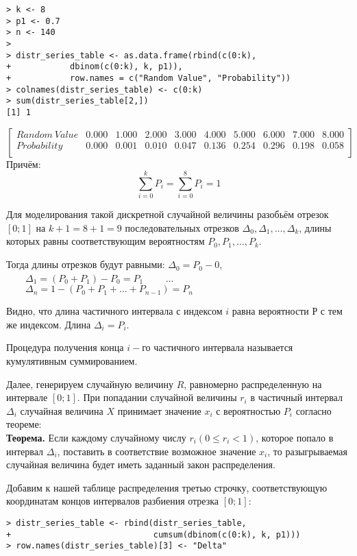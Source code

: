 \documentclass[14pt,a4paper]{scrartcl}
\begin{document}
\begin{verbatim}
> k <- 8
> p1 <- 0.7
> n <- 140
> 
> distr_series_table <- as.data.frame(rbind(c(0:k),
+            dbinom(c(0:k), k, p1)), 
+            row.names = c("Random Value", "Probability"))
> colnames(distr_series_table) <- c(0:k)
> sum(distr_series_table[2,])
[1] 1
\end{verbatim}

\begin{equation*}
	\begin{bmatrix}{}
	Random \: Value & 0.000 & 1.000 & 2.000 & 3.000 & 4.000 & 5.000 & 6.000 & 7.000 & 8.000 \\ 
	Probability & 0.000 & 0.001 & 0.010 & 0.047 & 0.136 & 0.254 & 0.296 & 0.198 & 0.058 \\ 
	\end{bmatrix}
\end{equation*}
Причём:
\begin{equation*}
	\sum_{i = 0}^{k}P_i = \sum_{i = 0}^{8}P_i = 1
\end{equation*}

Для моделирования такой дискретной случайной величины разобьём отрезок $[0;1]$ на $k+1 = 8 + 1 = 9$ последовательных отрезков $\Delta_0, \Delta_1, \dots, \Delta_{k}$, длины которых равны соответствующим вероятностям $P_0, P_1, \dots, P_{k}$.

Тогда длины отрезков будут равными: $\Delta_0 = P_0 - 0$, $\qquad \Delta_1 = (P_0 + P_1) - P_0 = P_1$ $\qquad \dots$$\qquad \Delta_n = 1 - (P_0 + P_1 + \dots + P_{n-1}) = P_n$

Видно, что длина частичного интервала с индексом $i$ равна вероятности $Р$ с тем же индексом. Длина $\Delta_i = P_i$.

Процедура получения конца $i-$го частичного интервала называется кумулятивным суммированием.

Далее, генерируем случайную величину $R$, равномерно распределенную на интервале $[0;1]$. При попадании случайной величины $r_i$ в частичный интервал $\Delta_i$ случайная величина $X$ принимает значение $x_i$ с вероятностью $P_i$ согласно теореме:\\
\textbf{Теорема.} Если каждому случайному числу $r_i(0\leq r_i < 1)$, которое попало в интервал $\Delta_i$, поставить в соответствие возможное значение $x_i$, то разыгрываемая случайная величина будет иметь заданный закон распределения.

Добавим к нашей таблице распределения третью строчку, соответствующую координатам концов интервалов разбиения отрезка $[0;1]$:
\begin{verbatim}
> distr_series_table <- rbind(distr_series_table,
+                             cumsum(dbinom(c(0:k), k, p1)))
> row.names(distr_series_table)[3] <- "Delta"
\end{verbatim}
\end{document}
